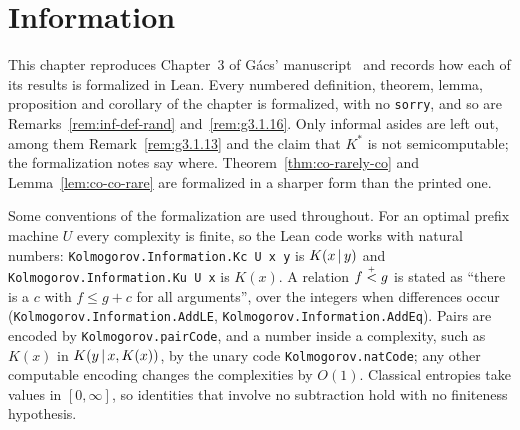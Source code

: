 %
%
%

\chapter{Information}

This chapter reproduces Chapter~3 of G\'acs' manuscript~\cite{Gacs2021} and records how
each of its results is formalized in Lean. Every numbered definition, theorem, lemma,
proposition and corollary of the chapter is formalized, with no \texttt{sorry}, and so are
Remarks~\ref{rem:inf-def-rand} and~\ref{rem:g3.1.16}. Only informal asides are left out,
among them Remark~\ref{rem:g3.1.13} and the claim that \( K^{*} \) is not semicomputable;
the formalization notes say where. Theorem~\ref{thm:co-rarely-co} and
Lemma~\ref{lem:co-co-rare} are formalized in a sharper form than the printed one.

Some conventions of the formalization are used throughout. For an optimal prefix machine
\( U \) every complexity is finite, so the Lean code works with natural numbers:
\texttt{Kolmogorov.Information.Kc U x y} is \( K(x \,\vert\, y) \) and
\texttt{Kolmogorov.Information.Ku U x} is \( K(x) \). A relation \( f \stackrel{{}_+}{<} g \) is stated as
``there is a \( c \) with \( f \le g + c \) for all arguments'', over the integers when
differences occur (\texttt{Kolmogorov.Information.AddLE},
\texttt{Kolmogorov.Information.AddEq}). Pairs are encoded by \texttt{Kolmogorov.pairCode}, and
a number inside a complexity, such as \( K(x) \) in \( K(y \,\vert\, x, K(x)) \), by the unary
code \texttt{Kolmogorov.natCode}; any other computable encoding changes the complexities
by \( O(1) \). Classical entropies take values in \( [0, \infty] \), so identities that
involve no subtraction hold with no finiteness hypothesis.

